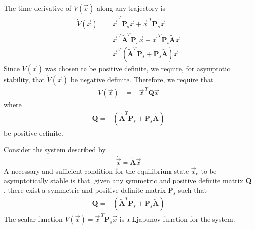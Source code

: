 \documentclass[12pt,a4paper,oneside]{book}
\begin{document}
\begin{onehalfspace}
The time derivative of $V(\vec{x})$ along any trajectory is
\begin{equation}\label{eqlyap13}
	\begin{aligned}
		\dot{V}(\vec{x}) &= \dot{\vec{x}}^{\ T}\mathbf{P}_s\vec{x}+{\vec{x}}^{\ 
		T}\mathbf{P}_s\dot{\vec{x}} = \\[6pt]
		&= \vec{x}^{\ T} \tilde{\mathbf{A}}^{T} 
		\mathbf{P}_s{\vec{x}}+{\vec{x}}^{\ 
		T}\mathbf{P}_s\tilde{\mathbf{A}}{\vec{x}} \\[6pt]
		& = \vec{x}^{\ T}\left( \tilde{\mathbf{A}}^{T} 
		\mathbf{P}_s+\mathbf{P}_s\tilde{\mathbf{A}}\right) \vec{x}
	\end{aligned}
\end{equation}
Since $V(\vec{x})$ was chosen to be positive definite, we require, for 
asymptotic stability, that $\dot{V}(\vec{x})$ be negative definite. Therefore, 
we require that
\begin{equation}\label{eqlyap14}
	\begin{aligned}
		\dot{V}(\vec{x}) &= -\vec{x}^{\ T}\mathbf{Q} \vec{x}
	\end{aligned}
\end{equation}
where 
\begin{equation}\label{eqlyap15}
	\begin{aligned}
		\mathbf{Q} = -\left( \tilde{\mathbf{A}}^{T} 
		\mathbf{P}_s+\mathbf{P}_s\tilde{\mathbf{A}}\right)
	\end{aligned}
\end{equation}
be positive definite. 
\begin{thm}
	Consider the system described by 
	\begin{equation*}
		\begin{aligned}
			\dot{\vec{x}}=\tilde{\mathbf{A}}\vec{x}
		\end{aligned}
	\end{equation*}
	A necessary and sufficient condition for the equilibrium state $\vec{x}_e$ 
	to be asymptotically stable is that, given any symmetric and positive 
	definite matrix $\mathbf{Q}$, there exist a symmetric and positive definite 
	matrix $\mathbf{P}_s$ such that
	\begin{equation*}
		\begin{aligned}
			\mathbf{Q} = -\left( \tilde{\mathbf{A}}^{T} 
			\mathbf{P}_s+\mathbf{P}_s\tilde{\mathbf{A}}\right)
		\end{aligned}
	\end{equation*}
	The scalar function $V(\vec{x})=\vec{x}^{\ T}\mathbf{P}_s\vec{x}$ is a 
	Ljapunov function for the system.

\end{thm}
\end{onehalfspace}
\end{document}
